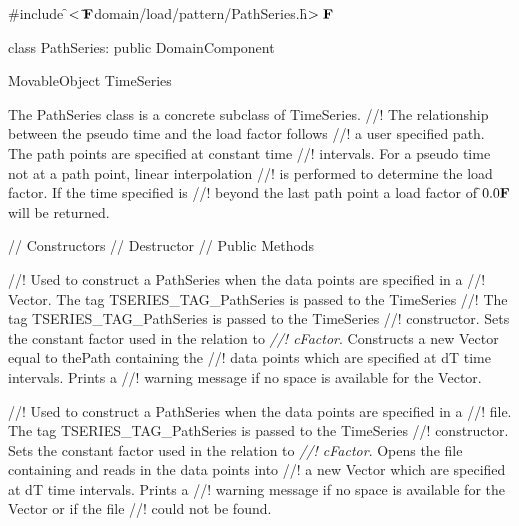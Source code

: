 
\indent \#include \f$<\tilde{ }{\bf F}$domain/load/pattern/PathSeries.h\f$>{\bf F}$

\indent class PathSeries: public DomainComponent

\indent MovableObject
\indent\indent TimeSeries
\indent\indent{}

\indent The PathSeries class is a concrete subclass of TimeSeries.
//! The relationship between the pseudo time and the load factor follows
//! a user specified path. The path points are specified at constant time
//! intervals. For a pseudo time not at a path point, linear interpolation
//! is performed to determine the load factor. If the time specified is
//! beyond the last path point a load factor of \f$0.0{\bf F}$ will be returned.

\indent // Constructors 
\indent // Destructor 
\indent // Public Methods 

//! Used to construct a PathSeries when the data points are specified in a
//! Vector. The tag TSERIES\_TAG\_PathSeries is passed to the TimeSeries
//! The tag TSERIES\_TAG\_PathSeries is passed to the TimeSeries
//! constructor. Sets the constant factor used in the relation to {\em
//! cFactor}. Constructs a new Vector equal to \p thePath containing the
//! data points which are specified at \p dT time intervals. Prints a
//! warning message if no space is available for the Vector.

//! Used to construct a PathSeries when the data points are specified in a
//! file. The tag TSERIES\_TAG\_PathSeries is passed to the TimeSeries
//! constructor. Sets the constant factor used in the relation to {\em
//! cFactor}. Opens the file containing and reads in the data points into
//! a new Vector which are specified at \p dT time intervals. Prints a
//! warning message if no space is available for the Vector or if the file
//! could not be found.


